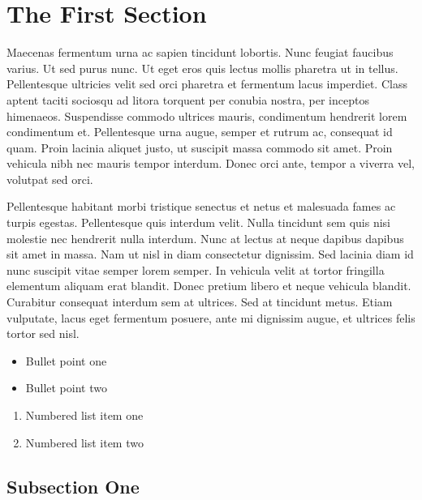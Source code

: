 \documentclass[preprint,12pt]{elsarticle}
\begin{document}
\linenumbers

\section{The First Section}



\label{S:1}

Maecenas \cite{Smith:2012qr} fermentum \cite{Smith:2013jd} urna ac sapien tincidunt lobortis. Nunc feugiat faucibus varius. Ut sed purus nunc. Ut eget eros quis lectus mollis pharetra ut in tellus. Pellentesque ultricies velit sed orci pharetra et fermentum lacus imperdiet. Class aptent taciti sociosqu ad litora torquent per conubia nostra, per inceptos himenaeos. Suspendisse commodo ultrices mauris, condimentum hendrerit lorem condimentum et. Pellentesque urna augue, semper et rutrum ac, consequat id quam. Proin lacinia aliquet justo, ut suscipit massa commodo sit amet. Proin vehicula nibh nec mauris tempor interdum. Donec orci ante, tempor a viverra vel, volutpat sed orci.

Pellentesque habitant morbi tristique senectus et netus et malesuada fames ac turpis egestas. Pellentesque quis interdum velit. Nulla tincidunt sem quis nisi molestie nec hendrerit nulla interdum. Nunc at lectus at neque dapibus dapibus sit amet in massa. Nam ut nisl in diam consectetur dignissim. Sed lacinia diam id nunc suscipit vitae semper lorem semper. In vehicula velit at tortor fringilla elementum aliquam erat blandit. Donec pretium libero et neque vehicula blandit. Curabitur consequat interdum sem at ultrices. Sed at tincidunt metus. Etiam vulputate, lacus eget fermentum posuere, ante mi dignissim augue, et ultrices felis tortor sed nisl.

\begin{itemize}
\item Bullet point one
\item Bullet point two
\end{itemize}

\begin{enumerate}
\item Numbered list item one
\item Numbered list item two
\end{enumerate}

\subsection{Subsection One}
\end{document}
